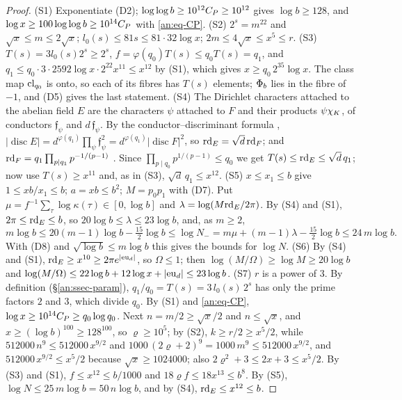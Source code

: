 \documentclass[10pt]{amsart}
\theoremstyle{definition}
\theoremstyle{remark}
\begin{document}
\begin{proof}
(S1) Exponentiate (D2); $\log\log b\ge10^{12}C_P\ge10^{12}$ gives
$\log b\ge128$, and $\log x\ge100\log\log b\ge10^{14}C_P$ with
\eqref{an:eq-CP}. (S2) $2^{s}=m^{22}$ and $\sqrt x\le m\le2\sqrt x$;
$l_0(s)\le81s\le81\cdot32\log x$; $2m\le4\sqrt x\le x^{5}\le r$.
(S3) $T(s)=3l_0(s)2^{s}\ge2^{s}$, $f=\varphi(q_0)T(s)\le q_0T(s)=q_1$, and
$q_1\le q_0\cdot3\cdot2592\log x\cdot2^{22}x^{11}\le x^{12}$ by (S1), which
gives $x\ge q_0\,2^{35}\log x$. The class map $\mathrm{cl}_{q_0}$ is onto, so each
of its fibres has $T(s)$ elements; $\Phi_b$ lies in the fibre of $-1$, and
(D5) gives the last statement.
(S4) The Dirichlet characters attached to the abelian field $E$ are the
characters $\psi$ attached to $F$ and their products $\psi\chi_K$, of
conductors $\mathfrak f_\psi$ and $d\,\mathfrak f_\psi$. By the
conductor--discriminant formula \cite[Theorem~3.11]{Washington},
$|\operatorname{disc}E|=d^{\varphi(q_1)}\prod_\psi\mathfrak f_\psi^{2}=d^{\varphi(q_1)}|\operatorname{disc}F|^{2}$,
so $\mathrm{rd}_E=\sqrt d\,\mathrm{rd}_F$; and
$\mathrm{rd}_F=q_1\prod_{p\mid q_1}p^{-1/(p-1)}$ \cite[Proposition~2.7]{Washington}.
Since $\prod_{p\mid q_0}p^{1/(p-1)}\le q_0$ we get
$T(s)\le\mathrm{rd}_E\le\sqrt d\,q_1$; now use $T(s)\ge x^{11}$ and, as in (S3),
$\sqrt d\,q_1\le x^{12}$.
(S5) $x\le x_1\le b$ give $1\le xb/x_1\le b$; $a=xb\le b^{2}$;
$M=p_0p_1$ with (D7). Put $\mu=f^{-1}\sum_\tau\log\kappa(\tau)\in[0,\log b]$
and $\lambda=\log(M\mathrm{rd}_E/2\pi)$. By (S4) and (S1),
$2\pi\le\mathrm{rd}_E\le b$, so $20\log b\le\lambda\le23\log b$, and, as $m\ge2$,
\[
 m\log b\le20(m-1)\log b-\tfrac{15}2\log b\le\log N_-=m\mu+(m-1)\lambda-\tfrac{15}2\log b\le24\,m\log b .
\]
With (D8) and $\sqrt{\log b}\le m\log b$ this gives the bounds for $\log N$.
(S6) By (S4) and (S1), $\mathrm{rd}_E\ge x^{10}\ge2\pi e^{|\mathrm{eu}_d|}$, so
$\Omega\le1$; then $\log(M/\Omega)\ge\log M\ge20\log b$ and
$\log(M/\Omega)\le22\log b+12\log x+|\mathrm{eu}_d|\le23\log b$.
(S7) $r$ is a power of $3$. By definition (\S\ref{an:ssec-param}), $q_1/q_0=T(s)=3\,l_0(s)\,2^{s}$
has only the prime factors $2$ and $3$, which divide $q_0$. By (S1) and \eqref{an:eq-CP},
$\log x\ge10^{14}C_P\ge q_0\log q_0$. Next $n=m/2\ge\sqrt x/2$ and $n\le\sqrt x$, and
$x\ge(\log b)^{100}\ge128^{100}$, so $\varrho\ge10^{5}$; by (S2), $k\ge r/2\ge x^{5}/2$, while
$512000\,n^{9}\le512000\,x^{9/2}$ and $1000\,(2\varrho+2)^{9}=1000\,m^{9}\le512000\,x^{9/2}$, and
$512000\,x^{9/2}\le x^{5}/2$ because $\sqrt x\ge1024000$; also $2\varrho^{2}+3\le2x+3\le x^{5}/2$.
By (S3) and (S1), $f\le x^{12}\le b/1000$ and $18\varrho f\le18x^{13}\le b^{8}$. By (S5),
$\log N\le25\,m\log b=50\,n\log b$, and by (S4), $\mathrm{rd}_E\le x^{12}\le b$.


\end{proof}
\end{document}
